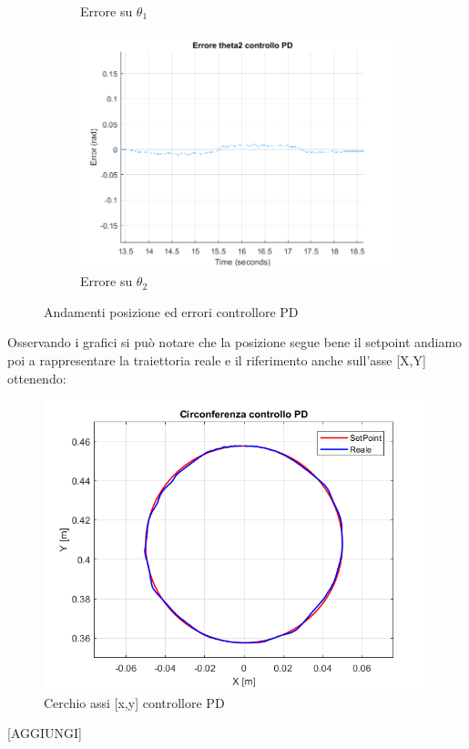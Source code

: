 \begin{figure}[!ht]
\begin{subfigure}{.5\textwidth}
  \caption{Errore su $\theta_1$}
  \label{fig:sub-pd3p}
\end{subfigure}
\begin{subfigure}{.5\textwidth}
  \centering
  \includegraphics[width=.8\linewidth]{Immagini/Traiettorie/ErroreTheta2PD}  
  \caption{Errore su $\theta_2$}
  \label{fig:sub-pd4p}
\end{subfigure}
\caption{Andamenti posizione ed errori controllore PD}
\label{fig:AndamentiPD}
\end{figure}
Osservando i grafici si può notare che la posizione segue bene il setpoint andiamo poi a rappresentare la traiettoria reale e il riferimento anche sull'asse [X,Y] ottenendo: 
\begin{figure}[ht]
	\begin{center}
		\includegraphics[scale=0.5]{Immagini/Traiettorie/Cerchio}
		\caption{Cerchio assi  [x,y] controllore PD}
		\label{fig:PDBracciaC}
	\end{center}
\end{figure}
[AGGIUNGI]
